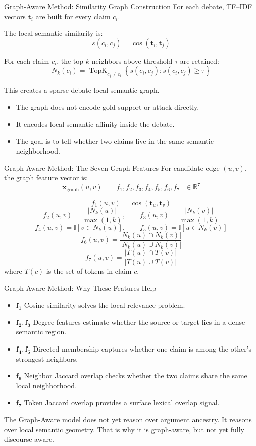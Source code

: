 \documentclass[aspectratio=169, 10pt]{beamer}
\newcommand{\takeawaybox}[2]{%
  \begin{tcolorbox}[colback=accentgreen!10, colframe=accentgreen,
    title={\textbf{Takeaway:} #1}, fonttitle=\bfseries\small,
    left=4pt, right=4pt, top=3pt, bottom=3pt, boxrule=1pt]
    \small #2
  \end{tcolorbox}}
\begin{document}
\begin{frame}[shrink=6]{Graph-Aware Method: Similarity Graph Construction}
For each debate, TF--IDF vectors \(\mathbf{t}_i\) are built for every claim \(c_i\).

The local semantic similarity is:
\[
s(c_i,c_j) = \cos(\mathbf{t}_i,\mathbf{t}_j)
\]

For each claim \(c_i\), the top-\(k\) neighbors above threshold \(\tau\) are retained:
\[
N_k(c_i) = \operatorname{TopK}_{c_j \neq c_i}\left\{s(c_i,c_j): s(c_i,c_j)\ge\tau\right\}
\]

This creates a sparse debate-local semantic graph.

\begin{itemize}
  \item The graph does not encode gold support or attack directly.
  \item It encodes local semantic affinity inside the debate.
  \item The goal is to tell whether two claims live in the same semantic neighborhood.
\end{itemize}
\end{frame}

\begin{frame}[shrink=6]{Graph-Aware Method: The Seven Graph Features}
For candidate edge \((u,v)\), the graph feature vector is:
\[
\mathbf{x}_{\mathrm{graph}}(u,v)=
[f_1,f_2,f_3,f_4,f_5,f_6,f_7]\in\mathbb{R}^7
\]

\[
f_1(u,v)=\cos(\mathbf{t}_u,\mathbf{t}_v)
\]
\[
f_2(u,v)=\frac{|N_k(u)|}{\max(1,k)}, \qquad
f_3(u,v)=\frac{|N_k(v)|}{\max(1,k)}
\]
\[
f_4(u,v)=\mathbb{I}[v\in N_k(u)], \qquad
f_5(u,v)=\mathbb{I}[u\in N_k(v)]
\]
\[
f_6(u,v)=\frac{|N_k(u)\cap N_k(v)|}{|N_k(u)\cup N_k(v)|}
\]
\[
f_7(u,v)=\frac{|T(u)\cap T(v)|}{|T(u)\cup T(v)|}
\]
where \(T(c)\) is the set of tokens in claim \(c\).
\end{frame}

\begin{frame}{Graph-Aware Method: Why These Features Help}
\begin{itemize}
  \item \(\mathbf{f_1}\) Cosine similarity solves the local relevance problem.
  \item \(\mathbf{f_2,f_3}\) Degree features estimate whether the source or target lies in a dense semantic region.
  \item \(\mathbf{f_4,f_5}\) Directed membership captures whether one claim is among the other's strongest neighbors.
  \item \(\mathbf{f_6}\) Neighbor Jaccard overlap checks whether the two claims share the same local neighborhood.
  \item \(\mathbf{f_7}\) Token Jaccard overlap provides a surface lexical overlap signal.
\end{itemize}

\takeawaybox{Important Intuition}{
The Graph-Aware model does not yet reason over argument ancestry. It reasons over local semantic geometry. That is why it is graph-aware, but not yet fully discourse-aware.
}
\end{frame}
\end{document}
